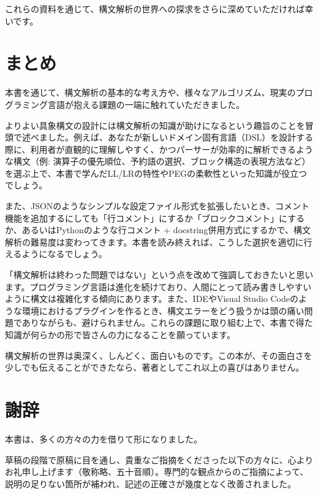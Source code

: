 これらの資料を通じて、構文解析の世界への探求をさらに深めていただければ幸いです。

\hypertarget{chapter8-ux307eux3068ux3081}{%
\section{まとめ}\label{chapter8-ux307eux3068ux3081}}

本書を通じて、構文解析の基本的な考え方や、様々なアルゴリズム、現実のプログラミング言語が抱える課題の一端に触れていただきました。

よりよい具象構文の設計には構文解析の知識が助けになるという趣旨のことを冒頭で述べました。例えば、あなたが新しいドメイン固有言語（DSL）を設計する際に、利用者が直観的に理解しやすく、かつパーサーが効率的に解析できるような構文（例:
演算子の優先順位、予約語の選択、ブロック構造の表現方法など）を選ぶ上で、本書で学んだLL/LRの特性やPEGの柔軟性といった知識が役立つでしょう。

また、JSONのようなシンプルな設定ファイル形式を拡張したいとき、コメント機能を追加するにしても「行コメント」にするか「ブロックコメント」にするか、あるいはPythonのような行コメント + docstring併用方式にするかで、構文解析の難易度は変わってきます。本書を読み終えれば、こうした選択を適切に行えるようになるでしょう。

「構文解析は終わった問題ではない」という点を改めて強調しておきたいと思います。プログラミング言語は進化を続けており、人間にとって読み書きしやすいように構文は複雑化する傾向にあります。また、IDEやVisual Studio Codeのような環境におけるプラグインを作るとき、構文エラーをどう扱うかは頭の痛い問題でありながらも、避けられません。これらの課題に取り組む上で、本書で得た知識が何らかの形で皆さんの力になることを願っています。

構文解析の世界は奥深く、しんどく、面白いものです。この本が、その面白さを少しでも伝えることができたなら、著者としてこれ以上の喜びはありません。

\hypertarget{chapter8-ux8b1dux8f9e}{%
\section{謝辞}\label{chapter8-ux8b1dux8f9e}}

本書は、多くの方々の力を借りて形になりました。

草稿の段階で原稿に目を通し、貴重なご指摘をくださった以下の方々に、心よりお礼申し上げます（敬称略、五十音順）。専門的な観点からのご指摘によって、説明の足りない箇所が補われ、記述の正確さが幾度となく改善されました。

